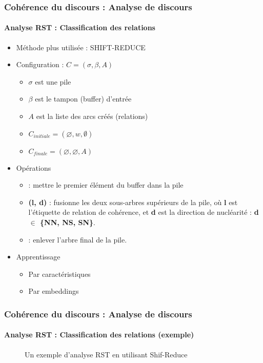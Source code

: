 \documentclass[xcolor=table]{beamer}
\begin{document}
\begin{frame}
	\frametitle{Cohérence du discours : Analyse de discours}
	\framesubtitle{Analyse RST : Classification des relations}
	
	\begin{minipage}{.6\textwidth}
	\begin{itemize}
		\item Méthode plus utilisée : SHIFT-REDUCE
		\item Configuration : $C = (\sigma, \beta, A)$
		\begin{itemize}
			\item $\sigma$ est une pile
			\item $\beta$ est le tampon (buffer) d'entrée
			\item $A$ est la liste des arcs créés (relations)
			\item $C_{initiale} = (\varnothing, w, \emptyset)$
			\item $C_{finale} = (\varnothing, \varnothing, A)$
		\end{itemize}
	\end{itemize}
	\end{minipage}
	\begin{minipage}{.38\textwidth}
	\end{minipage}
	\begin{itemize}
		\item Opérations 
		\begin{itemize}
			\item {} : mettre le premier élément du buffer dans la pile
			\item {}\textbf{(l, d)} : fusionne les deux sous-arbres supérieurs de la pile, où \textbf{l} est l'étiquette de relation de cohérence, et \textbf{d} est la direction de nucléarité : \textbf{d $ \in $ \{NN, NS, SN\}}.
			\item {} : enlever l'arbre final de la pile.
		\end{itemize}
		\item Apprentissage 
		\begin{itemize}
			\item Par caractéristiques
			\item Par embeddings
		\end{itemize}
	\end{itemize}
	
\end{frame}

\begin{frame}
	\frametitle{Cohérence du discours : Analyse de discours}
	\framesubtitle{Analyse RST : Classification des relations (exemple)}
	
	\begin{figure}
		
		\caption{Un exemple d'analyse RST en utilisant Shif-Reduce \cite{2018-yu-al}}
	\end{figure}
	
\end{frame}
\end{document}
